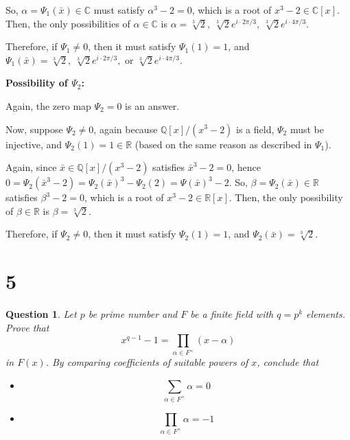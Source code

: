 \documentclass{article}
\newtheorem{question}{Question}
\begin{document}
\begin{itemize}
    So, $\alpha=\Psi_1(\bar{x})\in\mathbb{C}$ must satisfy $\alpha^3-2=0$, which is a root of $x^3-2\in\mathbb{C}[x]$. Then, the only possibilities of $\alpha\in \mathbb{C}$ is $\alpha=\sqrt[3]{2},\ \sqrt[3]{2}e^{i\cdot 2\pi/3},\ \sqrt[3]{2}e^{i\cdot 4\pi/3}$.

    Therefore, if $\Psi_1\neq 0$, then it must satisfy $\Psi_1(1)=1$, and $\Psi_1(\bar{x})=\sqrt[3]{2},\ \sqrt[3]{2}e^{i\cdot 2\pi/3},$ or $\sqrt[3]{2}e^{i\cdot 4\pi/3}$.

    \hfil

    \textbf{Possibility of $\Psi_2$:}

    Again, the zero map $\Psi_2=0$ is an answer.

    Now, suppose $\Psi_2\neq 0$, again because $\mathbb{Q}[x]/(x^3-2)$ is a field, $\Psi_2$ must be injective, and $\Psi_2(1)=1\in\mathbb{R}$ (based on the same reason as described in $\Psi_1$).

    Again, since $\bar{x}\in\mathbb{Q}[x]/(x^3-2)$ satisfies $\bar{x}^3-2=0$, hence $0=\Psi_2(\bar{x}^3-2)=\Psi_2(\bar{x})^3-\Psi_2(2)=\Psi(\bar{x})^3-2$.
    So, $\beta=\Psi_2(\bar{x})\in\mathbb{R}$ satisfies $\beta^3-2=0$, which is a root of $x^3-2\in\mathbb{R}[x]$. Then, the only possibility of $\beta\in\mathbb{R}$ is $\beta=\sqrt[3]{2}$.

    Therefore, if $\Psi_2\neq 0$, then it must satisfy $\Psi_2(1)=1$, and $\Psi_2(\bar{x})=\sqrt[3]{2}$.

\end{itemize}

\hfil

\hfil

\section*{5}
\begin{myBox}[]{}
    \begin{question}
        Let $p$ be  prime number and $F$ be a finite field with $q=p^k$ elements. Prove that
        $$x^{q-1}-1=\prod_{\alpha\in F^\times}(x-\alpha)$$
        in $F(x)$. By comparing coefficients of suitable powers of $x$, conclude that
        \begin{itemize}
            \item[(a)]$$\sum_{\alpha\in F^\times}\alpha =0$$
            \item[(b)] $$\prod_{\alpha\in F^{\times}}\alpha=-1$$
        \end{itemize}
    \end{question}
\end{myBox}
\end{document}
